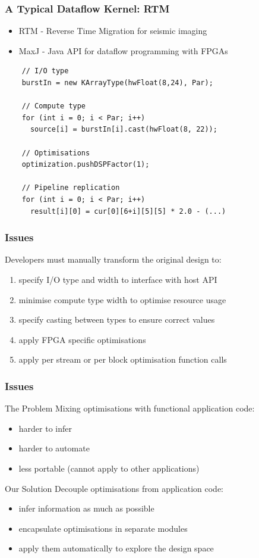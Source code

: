 \begin{frame}[fragile]
  \frametitle{A Typical Dataflow Kernel: RTM}
  \begin{itemize}
  \item RTM - Reverse Time Migration for seismic imaging
  \item MaxJ - Java API for dataflow programming with FPGAs
  \end{itemize}

  \begin{lstlisting}
    // I/O type
    burstIn = new KArrayType(hwFloat(8,24), Par);

    // Compute type
    for (int i = 0; i < Par; i++)
      source[i] = burstIn[i].cast(hwFloat(8, 22));

    // Optimisations
    optimization.pushDSPFactor(1);

    // Pipeline replication
    for (int i = 0; i < Par; i++)
      result[i][0] = cur[0][6+i][5][5] * 2.0 - (...)
  \end{lstlisting}
\end{frame}

\begin{frame}[fragile]
  \frametitle{Issues}
  Developers must manually transform the original design to:
  \begin{enumerate}
  \item specify I/O type and width to interface with host API
  \item minimise compute type width to optimise resource usage
  \item specify casting between types to ensure correct values
  \item apply FPGA specific optimisations
  \item apply per stream or per block optimisation function calls
  \end{enumerate}

\end{frame}

\begin{frame}[fragile]
  \frametitle{Issues}
  \begin{beamerboxesrounded}{The Problem}
    Mixing optimisations with functional application code:
    \begin{itemize}
    \item harder to infer
    \item harder to automate
    \item less portable (cannot apply to other applications)
    \end{itemize}
  \end{beamerboxesrounded}
  \begin{beamerboxesrounded}{Our Solution}
    Decouple optimisations from application code:
    \begin{itemize}
    \item infer information as much as possible
    \item encapsulate optimisations in separate modules
    \item apply them automatically to explore the design space
    \end{itemize}
  \end{beamerboxesrounded}
\end{frame}
